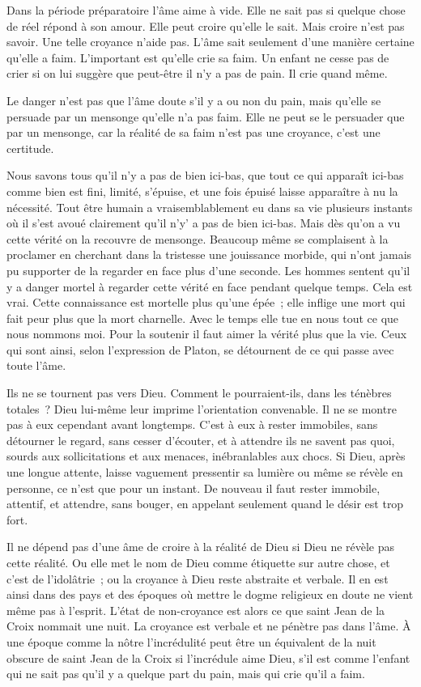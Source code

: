 \documentclass[french,twoside]{book} %
\begin{document}
Dans la période préparatoire l'âme aime à vide. Elle ne sait pas si quelque chose de réel répond à son amour. Elle peut croire qu'elle le sait. Mais croire n'est pas savoir. Une telle croyance n'aide pas. L'âme sait seulement d'une manière certaine qu'elle a faim. L'important est qu'elle crie sa faim. Un enfant ne cesse pas de crier si on lui suggère que peut-être il n'y a pas de pain. Il crie quand même.\par
Le danger n'est pas que l'âme doute s'il y a ou non du pain, mais qu'elle se persuade par un mensonge qu'elle n'a pas faim. Elle ne peut se le persuader que par un mensonge, car la réalité de sa faim n'est pas une croyance, c'est une certitude.\par
Nous savons tous qu'il n'y a pas de bien ici-bas, que tout ce qui apparaît ici-bas comme bien est fini, limité, s'épuise, et une fois épuisé laisse apparaître à nu la nécessité. Tout être humain a vraisemblablement eu dans sa vie plusieurs instants où il s'est avoué clairement qu'il n'y' a pas de bien ici-bas. Mais dès qu'on a vu cette vérité on la recouvre de mensonge. Beaucoup même se complaisent à la proclamer en cherchant dans la tristesse une jouissance morbide, qui n'ont jamais pu supporter de la regarder en face plus d'une seconde. Les hommes sentent qu'il y a danger mortel à regarder cette vérité en face pendant quelque temps. Cela est vrai. Cette connaissance est mortelle plus qu'une épée ; elle inflige une mort qui fait peur plus que la mort charnelle. Avec le temps elle tue en nous tout ce que nous nommons moi. Pour la soutenir il faut aimer la vérité plus que la vie. Ceux qui sont ainsi, selon l'expression de Platon, se détournent de ce qui passe avec toute l'âme.\par
Ils ne se tournent pas vers Dieu. Comment le pourraient-ils, dans les ténèbres totales ? Dieu lui-même leur imprime l'orientation convenable. Il ne se montre pas à eux cependant avant longtemps. C'est à eux à rester immobiles, sans détourner le regard, sans cesser d'écouter, et à attendre ils ne savent pas quoi, sourds aux sollicitations et aux menaces, inébranlables aux chocs. Si Dieu, après une longue attente, laisse vaguement pressentir sa lumière ou même se révèle en personne, ce n'est que pour un instant. De nouveau il faut rester immobile, attentif, et attendre, sans bouger, en appelant seulement quand le désir est trop fort.\par
Il ne dépend pas d'une âme de croire à la réalité de Dieu si Dieu ne révèle pas cette réalité. Ou elle met le nom de Dieu comme étiquette sur autre chose, et c'est de l'idolâtrie ; ou la croyance à Dieu reste abstraite et verbale. Il en est ainsi dans des pays et des époques où mettre le dogme religieux en doute ne vient même pas à l'esprit. L'état de non-croyance est alors ce que saint Jean de la Croix nommait une nuit. La croyance est verbale et ne pénètre pas dans l'âme. À une époque comme la nôtre l'incrédulité peut être un équivalent de la nuit obscure de saint Jean de la Croix si l'incrédule aime Dieu, s'il est comme l'enfant qui ne sait pas qu'il y a quelque part du pain, mais qui crie qu'il a faim.\par
\end{document}
